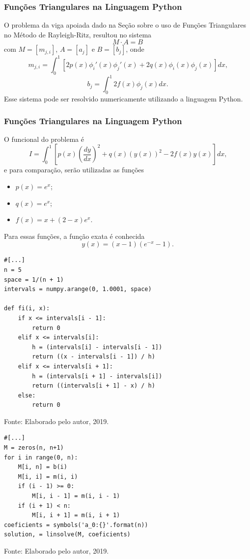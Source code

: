 \documentclass{beamer}
\newcommand{\fonte}[1]{
	\begin{center}
		\footnotesize Fonte: #1
	\end{center}
}
\newcommand{\fonteElaboradoPeloAutor}{
	\fonte{Elaborado pelo autor, 2019.}
}
\begin{document}
	\begin{frame}
		\frametitle{Funções Triangulares na Linguagem Python}
		\justify
	
		O problema da viga apoiada dado na Seção sobre o uso de Funções Triangulares no Método de Rayleigh-Ritz, resultou no sistema $$M\cdot A=B$$ com $M=[m_{j,i}]$, $A=[a_j]$ e $B=[b_j]$, onde
		$$
			m_{j,i}=\int_{0}^{1} \left [
				2p(x)\phi_i'(x)\phi_j'(x)
				+
				2q(x)\phi_i(x)\phi_j(x)
			\right ]dx
			\text{,}
		$$
		$$
			b_j=\int_{0}^{1} 2f(x)\phi_j(x)dx
			\text{.}
		$$
		\pause
		Esse sistema pode ser resolvido numericamente utilizando a linguagem Python.
	\end{frame}
	
	\begin{frame}
		\frametitle{Funções Triangulares na Linguagem Python}
		\justify
		
		O funcional do problema é
		$$
			I = \int_{0}^{1} \left [ 
					p(x) \left ( 
						\frac{dy}{dx}
					\right )^2
					+ q(x)(y(x))^2 
					- 2f(x)y(x) 
				\right ] dx
				\text{,}
		$$
		\pause
		e para comparação, serão utilizadas as funções
		\begin{itemize}
			\item $p(x)=e^x$;
			\item $q(x)=e^x$;
			\item $f(x)=x+(2-x)e^x$.
		\end{itemize}
		\pause
		
		Para essas funções, a função exata é conhecida
		$$
			y(x)=(x-1)(e^{-x}-1)
			\text{.}
		$$
	\end{frame}
		
	\begin{frame}[containsverbatim]
		\vspace{-8pt}
		\begin{lstlisting}[style=Python, numbers=none, caption={Trechos do código sobre funções triangulares}, captionpos=t]
#[...]
n = 5
space = 1/(n + 1)
intervals = numpy.arange(0, 1.0001, space)

def fi(i, x):
    if x <= intervals[i - 1]:
        return 0
    elif x <= intervals[i]:
        h = (intervals[i] - intervals[i - 1])
        return ((x - intervals[i - 1]) / h)
    elif x <= intervals[i + 1]:
        h = (intervals[i + 1] - intervals[i])
        return ((intervals[i + 1] - x) / h)
    else:
        return 0
		\end{lstlisting}
		\fonteElaboradoPeloAutor
	\end{frame}
	
	\begin{frame}[containsverbatim]
		\begin{lstlisting}[style=Python, numbers=none, caption={Trechos do código sobre funções triangulares}, captionpos=t]
#[...]
M = zeros(n, n+1)
for i in range(0, n):
    M[i, n] = b(i)
    M[i, i] = m(i, i)
    if (i - 1) >= 0:
        M[i, i - 1] = m(i, i - 1)
    if (i + 1) < n:
        M[i, i + 1] = m(i, i + 1)
coeficients = symbols('a_0:{}'.format(n))
solution, = linsolve(M, coeficients)
		\end{lstlisting}
		\fonteElaboradoPeloAutor
	\end{frame}
	
\end{document}
